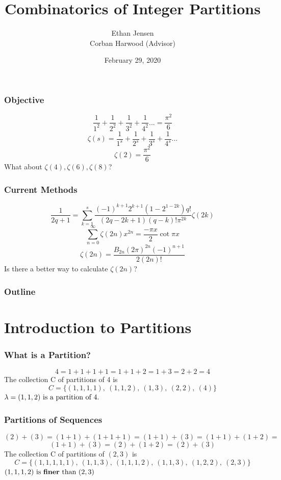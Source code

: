 \documentclass{beamer}
\title{Combinatorics of Integer Partitions}
\author{Ethan Jensen \\
\small Corban Harwood (Advisor)}
\institute{George Fox University}
\date{February 29, 2020}
\begin{document}

\frame{\titlepage}

\begin{frame}
  \frametitle{Objective}
  \[\frac{1}{1^2} + \frac{1}{2^2} + \frac{1}{3^2} + \frac{1}{4^2}...=\frac{\pi^2}{6}\]
  \newline
  \newline
  \[\zeta(s) = \frac{1}{1^s} + \frac{1}{2^s} + \frac{1}{3^s} + \frac{1}{4^s}...\]
  \newline
  \[\zeta(2) = \frac{\pi^2}{6}\]
  \newline
  What about \(\zeta(4), \zeta(6), \zeta(8)\)?
\end{frame}

\begin{frame}
  \frametitle{Current Methods}
  \[\frac{1}{2q+1}=\sum_{k=1}^s\frac{(-1)^{k+1}2^{k+1}(1-2^{1-2k})q!}{(2q-2k+1)(q-k)!\pi^{2k}}\zeta(2k)\]
  \newline
  \[\sum_{n=0}^{\infty}\zeta(2n)x^{2n} = \frac{-\pi x}{2}\cot{\pi x}\]
  \newline
  \[\zeta(2n) = \frac{B_{2n}(2\pi)^{2n}(-1)^{n+1}}{2(2n)!}\]
  \newline
  \newline
  Is there a better way to calculate \(\zeta(2n)\)?
\end{frame}

\begin{frame}
\frametitle{Outline}
\tableofcontents
\end{frame}

\section{Introduction to Partitions}

\begin{frame}
\frametitle{What is a Partition?}
\[4=1+1+1+1=1+1+2=1+3=2+2=4\]
\newline \newline \newline \newline
The collection C of partitions of 4 is
\[C = \{(1,1,1,1),\ (1,1,2),\ (1,3),\ (2,2),\ (4)\}\]
\newline \newline
\(\lambda = (1,1,2) \textup{ is a partition of 4.}\)
\end{frame}

\begin{frame}
\frametitle{Partitions of Sequences}
\[(2) + (3) = (1+1)+(1+1+1) = (1+1) + (3) = (1+1) + (1+2) = \]
\[(1+1) + (3) = (2) + (1+2) = (2) + (3)\]
\newline \newline \newline
The collection C of partitions of \((2,3)\) is
\[C=\{(1,1,1,1,1),\ (1,1,3),\ (1,1,1,2),\ (1,1,3),\ (1,2,2),\ (2,3)\}\]
\newline
\newline
\((1,1,1,2) \textup{ is \textbf{finer} than } (2,3)\)
\end{frame}
\end{document}
